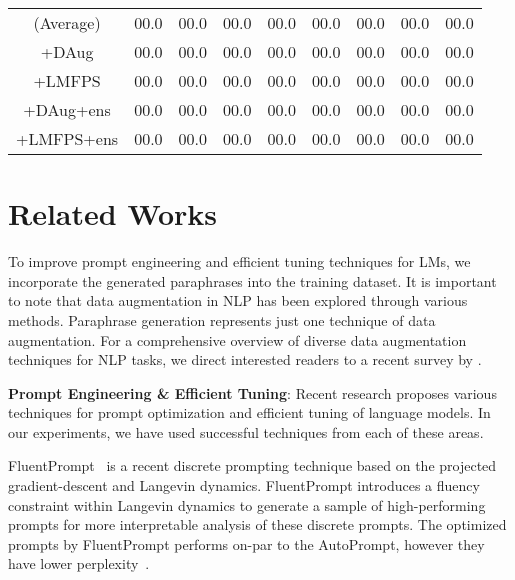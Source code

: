 \documentclass[11pt]{article}
\begin{document}
\begin{table*}
\begin{tabular}{c | c | c | c | c | c | c | c | c}
\hline
\hline
(Average) & \small00.0 & \small00.0 & \small00.0 & \small00.0 & \small00.0 & \small00.0 & \small00.0 & \small00.0\\
\small+DAug & \small00.0 & \small00.0 & \small00.0 & \small00.0 & \small00.0 & \small00.0 & \small00.0 & \small00.0\\
\small+LMFPS & \small00.0 & \small00.0 & \small00.0 & \small00.0 & \small00.0 & \small00.0 & \small00.0 & \small00.0\\
\small+DAug+ens & \small00.0 & \small00.0 & \small00.0 & \small00.0 & \small00.0 & \small00.0 & \small00.0 & \small00.0\\
\small+LMFPS+ens  & \small00.0 & \small00.0 & \small00.0 & \small00.0 & \small00.0 & \small00.0 & \small00.0 & \small00.0\\
\hline
\end{tabular}
\label{lmfps-vs-dataaug-vs-main-32-shot}
\end{table*}

\section{Related Works}
To improve prompt engineering and efficient tuning techniques for LMs, we incorporate the generated paraphrases into the training dataset. It is important to note that data augmentation in NLP has been explored through various methods. Paraphrase generation represents just one technique of data augmentation. For a comprehensive overview of diverse data augmentation techniques for NLP tasks, we direct interested readers to a recent survey by \citet{DBLP:journals/corr/abs-2106-07499}.

\noindent
{\bf Prompt Engineering \& Efficient Tuning}: Recent research proposes various techniques for prompt optimization and efficient tuning of language models. In our experiments, we have used successful techniques from each of these areas.

FluentPrompt~\cite{shi2022human} is a recent discrete prompting technique based on the projected gradient-descent and Langevin dynamics. FluentPrompt introduces a fluency constraint within Langevin dynamics to generate a sample of high-performing prompts for more interpretable analysis of these discrete prompts. The optimized prompts by FluentPrompt performs on-par to the AutoPrompt, however they have lower perplexity~\cite{shi2022human}.
\end{document}
